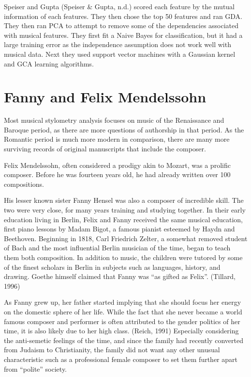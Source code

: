 \documentclass[12pt,twoside]{reedthesis}
\theoremstyle{definition}
\theoremstyle{definition}
\theoremstyle{definition}
\theoremstyle{remark}
\begin{document}
Speiser and Gupta (Speiser \& Gupta, n.d.) scored each feature by the
mutual information of each features. They then chose the top 50 features
and ran GDA. They then ran PCA to attempt to remove some of the
dependencies associated with musical features. They first fit a Naive
Bayes for classification, but it had a large training error as the
independence assumption does not work well with musical data. Next they
used support vector machines with a Gaussian kernel and GCA learning
algorithms.

\section{Fanny and Felix Mendelssohn}\label{fanny-and-felix-mendelssohn}

Most musical stylometry analysis focuses on music of the Renaissance and
Baroque period, as there are more questions of authorship in that
period. As the Romantic period is much more modern in comparison, there
are many more surviving records of original manuscripts that include the
composer.

Felix Mendelssohn, often considered a prodigy akin to Mozart, was a
prolific composer. Before he was fourteen years old, he had already
written over 100 compositions.

His lesser known sister Fanny Hensel was also a composer of incredible
skill. The two were very close, for many years training and studying
together. In their early education living in Berlin, Felix and Fanny
received the same musical education, first piano lessons by Madam Bigot,
a famous pianist esteemed by Haydn and Beethoven. Beginning in 1818,
Carl Friedrich Zelter, a somewhat removed student of Bach and the most
influential Berlin musician of the time, began to teach them both
composition. In addition to music, the children were tutored by some of
the finest scholars in Berlin in subjects such as languages, history,
and drawing. Goethe himself claimed that Fanny was ``as gifted as
Felix''. (Tillard, 1996)

As Fanny grew up, her father started implying that she should focus her
energy on the domestic sphere of her life. While the fact that she never
became a world famous composer and performer is often attributed to the
gender politics of her time, it is also likely due to her high class.
(Reich, 1991) Especially considering the anti-semetic feelings of the
time, and since the family had recently converted from Judaism to
Christianity, the family did not want any other unusual characteristic
such as a professional female composer to set them further apart from
``polite'' society.
\end{document}
